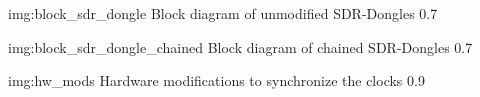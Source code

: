              {img:block_sdr_dongle}
             {Block diagram of unmodified SDR-Dongles}
             {0.7}

             {img:block_sdr_dongle_chained}
             {Block diagram of chained SDR-Dongles}
             {0.7}

             {img:hw_mods}
             {Hardware modifications to synchronize the clocks}
             {0.9}
